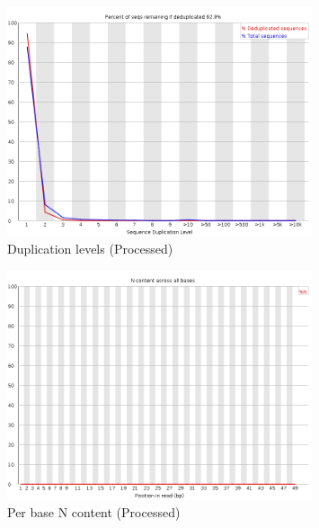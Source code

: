 \documentclass[UTF8]{ctexart}
\begin{document}
\clearpage

\begin{figure}[!htb]
	\centering
	\includegraphics[width=0.8\textwidth]{img/SRR14325859_FastQC_Processed_img/duplication_levels.png}	%
	\caption{Duplication levels (Processed)\protect}    %
\end{figure}

\begin{figure}[!htb]
	\centering
	\includegraphics[width=0.8\textwidth]{img/SRR14325859_FastQC_Processed_img/per_base_n_content.png}	%
	\caption{Per base N content (Processed)\protect}    %
\end{figure}

\clearpage
\end{document}
